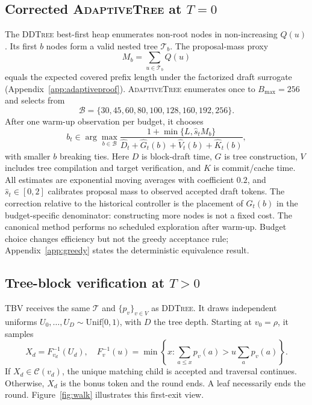 \documentclass{article}
\newcommand{\T}{\mathcal{T}}
\newcommand{\C}{\mathcal{C}}
\newcommand{\TBV}{\textnormal{\textsc{TBV}}}
\newcommand{\AdaptiveTree}{\textnormal{\textsc{AdaptiveTree}}}
\newcommand{\DDTree}{\textnormal{\textsc{DDTree}}}
\begin{document}
\subsection{Corrected \AdaptiveTree{} at \texorpdfstring{$T=0$}{T=0}}

The \DDTree{} best-first heap enumerates non-root nodes in non-increasing $Q(u)$.  Its first $b$ nodes form a valid nested tree $\T_b$.  The proposal-mass proxy
\begin{equation}
  M_b=\sum_{u\in\T_b}Q(u)
  \label{eq:massproxy}
\end{equation}
equals the expected covered prefix length under the factorized draft surrogate (Appendix~\ref{app:adaptiveproof}).  \AdaptiveTree{} enumerates once to $B_{\max}=256$ and selects from
\begin{equation}
\mathcal{B}=\{30,45,60,80,100,128,160,192,256\}.
\end{equation}
After one warm-up observation per budget, it chooses
\begin{equation}
 b_t\in\arg\max_{b\in\mathcal B}
 \frac{1+\min\{L,\widehat{s}_t M_b\}}
 {\widehat D_t+\widehat G_t(b)+\widehat V_t(b)+\widehat K_t(b)},
 \label{eq:controller}
\end{equation}
with smaller $b$ breaking ties.  Here $D$ is block-draft time, $G$ is tree construction, $V$ includes tree compilation and target verification, and $K$ is commit/cache time.  All estimates are exponential moving averages with coefficient $0.2$, and $\widehat s_t\in[0,2]$ calibrates proposal mass to observed accepted draft tokens.  The correction relative to the historical controller is the placement of $G_t(b)$ in the budget-specific denominator: constructing more nodes is not a fixed cost.  The canonical method performs no scheduled exploration after warm-up.  Budget choice changes efficiency but not the greedy acceptance rule; Appendix~\ref{app:greedy} states the deterministic equivalence result.

\subsection{Tree-block verification at \texorpdfstring{$T>0$}{T>0}}

\TBV{} receives the same $\T$ and $\{p_v\}_{v\in V}$ as \DDTree.  It draws independent uniforms $U_0,\ldots,U_D\sim\mathrm{Unif}[0,1)$, with $D$ the tree depth.  Starting at $v_0=\rho$, it samples
\begin{equation}
X_d=F_{v_d}^{-1}(U_d),\quad
F_v^{-1}(u)=\min\left\{x:\sum_{a\le x}p_v(a)>u\sum_a p_v(a)\right\}.
\label{eq:inversecdf}
\end{equation}
If $X_d\in\C(v_d)$, the unique matching child is accepted and traversal continues.  Otherwise, $X_d$ is the bonus token and the round ends.  A leaf necessarily ends the round.  Figure~\ref{fig:walk} illustrates this first-exit view.
\end{document}
